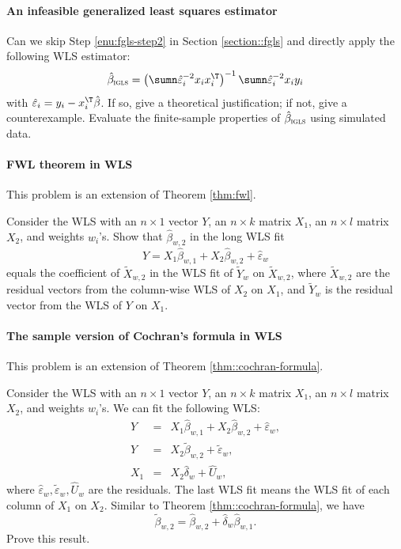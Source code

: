  


\paragraph{An infeasible generalized least squares estimator}

Can we skip Step \ref{enu:fgls-step2} in Section \ref{section::fgls} and directly apply the following
WLS estimator:
\[
\hat{\beta}_{\textsc{igls}}=\left(\sumn\hat{\varepsilon}_{i}^{-2}x_{i}x_{i}^{\T}\right)^{-1}\sumn\hat{\varepsilon}_{i}^{-2}x_{i}y_{i}
\]
with $\hat{\varepsilon}_i = y_i - x_i^{\T} \hat{\beta}$. 
If so, give a theoretical justification; if not, give a counterexample. Evaluate the finite-sample properties of $\hat{\beta}_{\textsc{igls}}$ using simulated data.


\paragraph{FWL theorem in WLS}\label{hw16::fwl-wls}

This problem is an extension of Theorem \ref{thm:fwl}. 

Consider the WLS with an $n\times 1$ vector $Y$, an $n\times k$ matrix $X_1$, an $n\times l$ matrix $X_2$, and weights $w_{i}$'s. 
Show that $\hat{\beta}_{w,2} $ in the long WLS fit
\[
Y=X_{1}\hat{\beta}_{w,1}+X_{2}\hat{\beta}_{w,2}+\hat{\varepsilon}_{w}
\]
equals the coefficient of $\tilde{X}_{w,2}$ in the WLS fit of $\tilde{Y}_{w}$ on  $\tilde{X}_{w,2}$,
where $\tilde{X}_{w,2}$ are the residual vectors from the column-wise
WLS of $X_{2}$ on $X_{1}$, and $\tilde{Y}_{w}$ is the residual
vector from the WLS of $Y$ on $X_{1}$. 


\paragraph{The sample version of Cochran's formula in WLS}\label{hw16::wls-sample-cochran-formula}

This problem is an extension of Theorem \ref{thm::cochran-formula}. 


Consider the WLS with an $n\times 1$ vector $Y$, an $n\times k$ matrix $X_1$, an $n\times l$ matrix $X_2$, and weights $w_{i}$'s. 
We can fit the following WLS:
\begin{eqnarray*}
Y &=& X_1 \hat{\beta}_{w,1} + X_2 \hat{\beta}_{w,2}+ \hat{\varepsilon}_{w},\\
Y &=& X_2 \tilde{\beta}_{w,2} + \tilde{\varepsilon}_w ,\\
X_1 &=& X_2 \hat{\delta}_w + \hat{U}_w,
\end{eqnarray*}
where $\hat{\varepsilon}_w, \tilde{\varepsilon}_w , \hat{U}_w$ are the residuals. 
The last WLS fit means the WLS fit of each column of $X_1$ on $X_2$. Similar to Theorem \ref{thm::cochran-formula}, we have 
$$
\tilde{\beta}_{w,2} = \hat{\beta}_{w,2} +  \hat{\delta}_w \hat{\beta}_{w,1}.
$$
Prove this result. 



